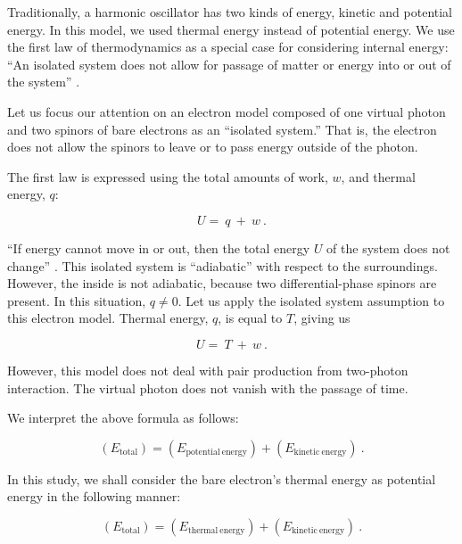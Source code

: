 \documentclass[%
 reprint,
 amsmath,amssymb,
 aps,
]{revtex4-1}
\numberwithin{equation}{section}
\begin{document}
    Traditionally, a harmonic oscillator has two kinds of energy, kinetic and potential energy. In this model, we used thermal energy instead of potential energy. We use the first law of thermodynamics as a special case for considering internal energy: ``An isolated system does not allow for passage of matter or energy into or out of the system'' \cite{David Ball}.

    Let us focus our attention on an electron model composed of one virtual photon and two spinors of bare electrons as an ``isolated system.'' That is, the electron does not allow the spinors to leave or to pass energy outside of the photon.

    The first law is expressed using the total amounts of work, $ w $, and thermal energy, $ q $:

        \begin{equation}
            U = \ q \ + \ w
            \ .
            \label{e3_U=q+w}
        \end{equation}

    ``If energy cannot move in or out, then the total energy $ U $ of the system does not change'' \cite{David Ball}. This isolated system is ``adiabatic'' with respect to the surroundings. However, the inside is not adiabatic, because two differential-phase spinors are present. In this situation, $ q \neq 0 $. Let us apply the isolated system assumption to this electron model. Thermal energy, $ q $, is equal to $T$, giving us

        \begin{equation}
            U = \ T \ + \ w
            \ .
            \label{e3_U=T+w}
        \end{equation}

    However, this model does not deal with pair production from two-photon interaction. The virtual photon does not vanish with the passage of time.

    We interpret the above formula as follows:

        \begin{equation}
            \left( E_{\mathrm{total}} \right) = \left( E_{\mathrm{potential \ energy}} \right) + \left( E_{\mathrm{kinetic \ energy}} \right)
            \ .
            \label{e3_E_total^2_04}
        \end{equation}

    In this study, we shall consider the bare electron's thermal energy as potential energy in the following manner:

        \begin{equation}
            \left( E_{\mathrm{total}} \right) = \left( E_{\mathrm{thermal \ energy}} \right) + \left( E_{\mathrm{kinetic \ energy}} \right)
            \ .
            \label{e3_E_total^2_05}
        \end{equation}
\end{document}
